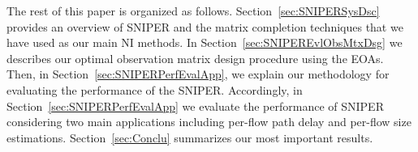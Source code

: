 The rest of this paper is organized as follows. Section~\ref{sec:SNIPERSysDsc} provides an overview of SNIPER and
the matrix completion techniques that we have used as our main NI methods.  In Section~\ref{sec:SNIPEREvlObsMtxDsg} we describes our
optimal observation matrix design procedure using the EOAs. Then, in Section~\ref{sec:SNIPERPerfEvalApp}, we explain our methodology for evaluating the performance of the SNIPER. Accordingly, in Section~\ref{sec:SNIPERPerfEvalApp} we evaluate the performance of SNIPER considering two main applications including per-flow path delay and per-flow size estimations. Section~\ref{sec:Conclu} summarizes our most important results. 

